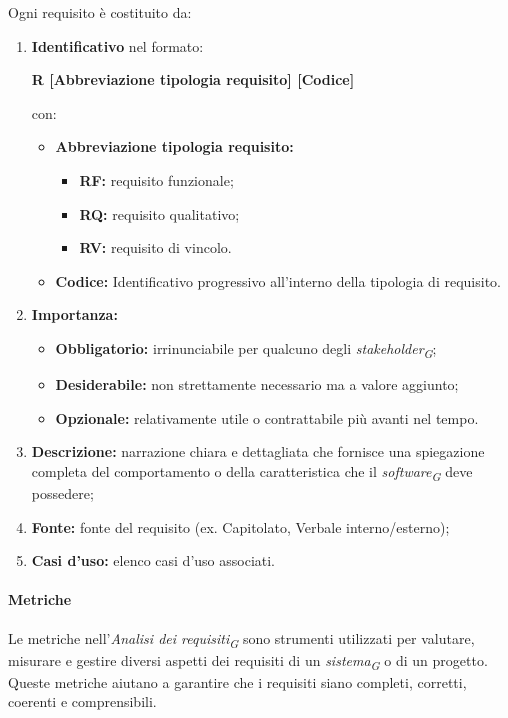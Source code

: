 Ogni requisito è costituito da:
\begin{enumerate}
    \item \textbf{Identificativo} nel formato:\\
    \begin{center}
        \textbf{R [Abbreviazione tipologia requisito] [Codice]}
    \end{center}
    con:
    \begin{itemize}
        \item \textbf{Abbreviazione tipologia requisito:}
            \begin{itemize}
                \item \textbf{RF:} requisito funzionale;
                \item \textbf{RQ:} requisito qualitativo;
                \item \textbf{RV:} requisito di vincolo.
            \end{itemize}
        \item \textbf{Codice:} Identificativo progressivo all'interno della tipologia di requisito.
    \end{itemize}
    \item \textbf{Importanza:}
          \begin{itemize}
              \item \textbf{Obbligatorio:} irrinunciabile per qualcuno degli \textit{stakeholder}\textsubscript{\textit{G}};
              \item \textbf{Desiderabile:} non strettamente necessario ma a valore aggiunto;
              \item \textbf{Opzionale:} relativamente utile o contrattabile più avanti nel tempo.
          \end{itemize}
    \item \textbf{Descrizione:} narrazione chiara e dettagliata che fornisce una spiegazione completa del comportamento o della caratteristica che il \textit{software}\textsubscript{\textit{G}} deve possedere;
    \item \textbf{Fonte:} fonte del requisito (ex. Capitolato, Verbale interno/esterno);
    \item \textbf{Casi d'uso:} elenco casi d'uso associati.
\end{enumerate}

\vspace{0.3cm}

\paragraph{Metriche}
Le metriche nell'\textit{Analisi dei requisiti}\textsubscript{\textit{G}} sono strumenti utilizzati per valutare, misurare e gestire diversi aspetti dei requisiti di un \textit{sistema}\textsubscript{\textit{G}} o di un progetto. Queste metriche aiutano a garantire che i requisiti siano completi, corretti, coerenti e comprensibili.

